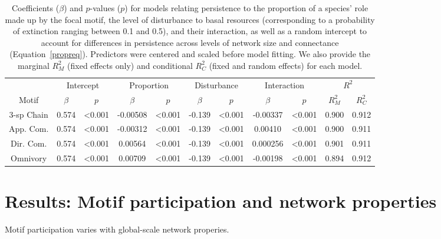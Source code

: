 \documentclass[12pt]{article}
\begin{document}
\begin{spacing}{2.0}
    
    \begin{table}[h!]
        \centering
        \caption{Coefficients ($\beta$) and $p$-values ($p$) for models relating persistence to the proportion of a species' role made up by the focal motif, the level of disturbance to basal resources (corresponding to a probability of extinction ranging between 0.1 and 0.5), and their interaction, as well as a random intercept to account for differences in persistence across levels of network size and connectance (Equation~\ref{propreq}). Predictors were centered and scaled before model fitting. We also provide the marginal $R^2_M$ (fixed effects only) and conditional $R^2_C$ (fixed and random effects) for each model.}
        \label{tab:proportion}                \footnotesize
        \begin{tabular}{c|c c | c c | c c | c c | c c |}
        & \multicolumn{2}{c|}{Intercept} & \multicolumn{2}{c|}{Proportion} & \multicolumn{2}{c|}{Disturbance} & \multicolumn{2}{c|}{Interaction} & \multicolumn{2}{c|}{$R^2$} \\
        Motif & $\beta$ & $p$ & $\beta$ & $p$ & $\beta$ & $p$ & $\beta$ & $p$ & $R^2_M$ & $R^2_C$ \\
        \hline
        3-sp Chain & 0.574 & \textless0.001 & -0.00508 & \textless0.001 & -0.139 & \textless0.001 & -0.00337 & \textless0.001 & 0.900 & 0.912 \\
        App. Com. & 0.574 & \textless0.001 & -0.00312 & \textless0.001 & -0.139 & \textless0.001 & 0.00410 & \textless0.001 & 0.900 & 0.911 \\
        Dir. Com. & 0.574 & \textless0.001 & 0.00564 & \textless0.001 & -0.139 & \textless0.001 & 0.000256 & \textless0.001 & 0.901 & 0.911 \\
        Omnivory & 0.574 & \textless0.001 & 0.00709 & \textless0.001 & -0.139 & \textless0.001 & -0.00198 & \textless0.001 & 0.894 & 0.912 \\
        \end{tabular}
    \end{table}        
\clearpage     


\section{Results: Motif participation and network properties}


    Motif participation varies with global-scale network properies.


\end{spacing}
\end{document}
